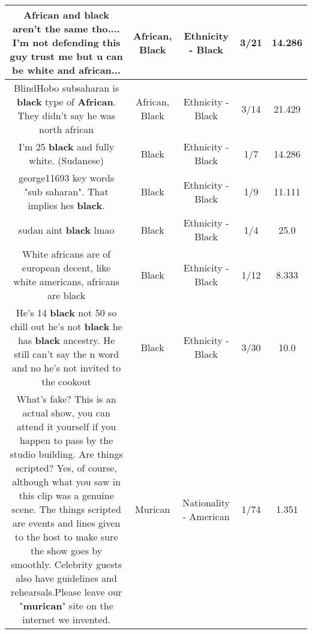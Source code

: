 \documentclass[11pt]{article}
\newlength\mylength
\begin{document}
\begin{center}
\begin{longtable}{|C{.65\mylength}|C{.30\mylength}|C{.12\mylength}|C{.12\mylength}|C{.12\mylength}|}
  \small African and \textbf{black} aren't the same tho.... I'm not defending this guy trust me but u can be white and \textbf{african}...\normalsize   & African, Black & Ethnicity - Black & 3/21 & 14.286 \\  \hline
  \small BlindHobo subsaharan is \textbf{black} type of \textbf{African}. They didn't say he was north african\normalsize   & African, Black & Ethnicity - Black & 3/14 & 21.429 \\  \hline
  \small I'm 25 \textbf{black} and fully white. (Sudanese)\normalsize   & Black & Ethnicity - Black & 1/7 & 14.286 \\  \hline
  \small george11693 key words "sub saharan". That implies hes \textbf{black}.\normalsize   & Black & Ethnicity - Black & 1/9 & 11.111 \\  \hline
  \small sudan aint \textbf{black} lmao\normalsize   & Black & Ethnicity - Black & 1/4 & 25.0 \\  \hline
  \small White africans are of european decent, like white americans, africans are black\normalsize   & Black & Ethnicity - Black & 1/12 & 8.333 \\  \hline
  \small He's 14 \textbf{black} not 50 so chill out he's not \textbf{black} he has \textbf{black} ancestry. He still can't say the n word and no he's not invited to the cookout\normalsize   & Black & Ethnicity - Black & 3/30 & 10.0 \\  \hline
  \small What's fake? This is an actual show, you can attend it yourself if you happen to pass by the studio building. Are things scripted? Yes, of course, although what you saw in this clip was a genuine scene. The things scripted are events and lines given to the host to make sure the show goes by smoothly. Celebrity guests also have guidelines and rehearsals.Please leave our "\textbf{murican}" site on the internet we invented.\normalsize   & Murican & Nationality - American & 1/74 & 1.351 \\  \hline

\end{longtable}
\end{center}
\end{document}
